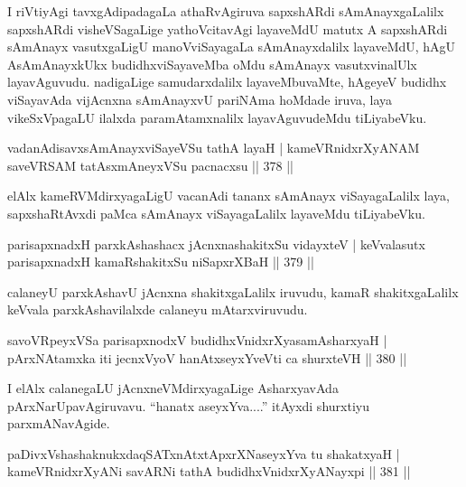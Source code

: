 \begin{artha}
I riVtiyAgi tavxgAdipadagaLa athaRvAgiruva sapxshARdi sAmAnayxgaLalilx sapxshARdi visheVSagaLige yathoVcitavAgi layaveMdU matutx A sapxshARdi sAmAnayx vasutxgaLigU manoVviSayagaLa sAmAnayxdalilx layaveMdU, hAgU A\break sAmAnayxkUkx budidhxviSayaveMba oMdu sAmAnayx vasutxvinalUlx layavAguvudu. nadigaLige samudarxdalilx layaveMbuvaMte, hAgeyeV budidhx viSayavAda vijAcnxna sAmAnayxvU pariNAma hoMdade iruva, laya vikeSxVpagaLU ilalxda paramAtamxnalilx layavAguvudeMdu tiLiyabeVku.
\end{artha}

\begin{shl}
vadanAdisavxsAmAnayxviSayeVSu tathA layaH |
kameVRnidxrXyANAM saveVRSAM tatAsxmAneyxVSu pacnacxsu \hfill || 378 ||
\end{shl}

\begin{artha}
elAlx kameRVMdirxyagaLigU vacanAdi tananx sAmAnayx viSayagaLalilx laya, sapxshaRtAvxdi paMca sAmAnayx viSayagaLalilx layaveMdu tiLiyabeVku.
\end{artha}


\begin{shl}
parisapxnadxH parxkAshashacx jAcnxnashakitxSu vidayxteV |
keVvalasutx parisapxnadxH kamaRshakitxSu niSapxrXBaH \hfill || 379 ||
\end{shl}

\begin{artha}
calaneyU parxkAshavU jAcnxna shakitxgaLalilx iruvudu, kamaR shakitxgaLalilx keVvala parxkAshavilalxde calaneyu mAtarxviruvudu.
\end{artha}

\begin{shl}
savoVR\s peyxVSa parisapxnodxV budidhxVnidxrXyasamAsharxyaH |
pArxNAtamxka iti jecnxVyoV hanAtxseyxYveVti ca shurxteVH \hfill || 380 ||
\end{shl}


\begin{artha}
I elAlx calanegaLU jAcnxneVMdirxyagaLige AsharxyavAda pArxNarUpavAgiruvavu. ``hanatx aseyxYva....'' itAyxdi shurxtiyu parxmANavAgide.
\end{artha}

\begin{shl}
paDivxVshashaknukxdaqSATxnAtxtApxrXNaseyxYva tu shakatxyaH |
kameVRnidxrXyANi savARNi tathA budidhxVnidxrXyANayxpi \hfill || 381 ||
\end{shl}


